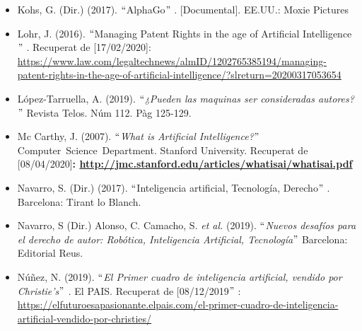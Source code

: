 \documentclass[12pt]{article}
\renewcommand{\_}{\kern-1.5pt\textunderscore\kern-1.5pt}
\begin{document}
\begin{itemize}
\begin{itemize}
\vspace{\baselineskip}
	\item Kohs, G. (Dir.) (2017). $``$AlphaGo$"$ .\textit{ }[Documental].\textit{ }EE.UU.: Moxie Pictures\par


\vspace{\baselineskip}
	\item Lohr, J. (2016). $``$Managing Patent Rights in the age of Artificial Intelligence$"$ . Recuperat de [17/02/2020]: \href{https://www.law.com/legaltechnews/almID/1202765385194/managing-patent-rights-in-the-age-of-artificial-intelligence/?slreturn=20200317053654}{https://www.law.com/legaltechnews/almID/1202765385194/managing-patent-rights-in-the-age-of-artificial-intelligence/?slreturn=20200317053654}\par


\vspace{\baselineskip}
	\item López-Tarruella, A. (2019). \textit{$``$¿Pueden las maquinas ser consideradas autores?}$"$  Revista Telos. Núm 112. Pàg 125-129.\par


\vspace{\baselineskip}
	\item Mc Carthy, J. (2007).\textit{ $``$What is Artificial Intelligence?$"$  }Computer\ Science\ Department. Stanford University.   Recuperat de [08/04/2020]\textbf{:\textit{ \href{http://jmc.stanford.edu/articles/whatisai/whatisai.pdf}{}}\textcolor[HTML]{0000FF}{\ul{http://jmc.stanford.edu/articles/whatisai/whatisai.pdf}}}\par


\vspace{\baselineskip}
	\item Navarro, S. (Dir.) (2017). $``$Inteligencia artificial, Tecnología, Derecho$"$ . Barcelona: Tirant lo Blanch.\par


\vspace{\baselineskip}
	\item Navarro, S (Dir.) Alonso, C. Camacho, S. \textit{et al.} (2019). $``$\textit{Nuevos desafíos para el derecho de autor: Robótica, Inteligencia Artificial, Tecnología$"$  }Barcelona: Editorial Reus.\par


\vspace{\baselineskip}
	\item Núñez, N. (2019). $``$\textit{El Primer cuadro de inteligencia artificial, vendido por Christie’s$"$ . }El PAIS. Recuperat de [08/12/2019$"$ : \href{https://elfuturoesapasionante.elpais.com/el-primer-cuadro-de-inteligencia-artificial-vendido-por-christies/}{https://elfuturoesapasionante.elpais.com/el-primer-cuadro-de-inteligencia-artificial-vendido-por-christies/}\par



\end{itemize}
\end{itemize}
\end{document}
